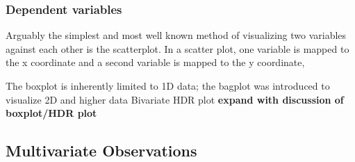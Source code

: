 \documentclass[../main.tex]{subfiles}
\begin{document}
\subsubsection{Dependent variables}
Arguably the simplest and most well known method of visualizing two
variables against each other is the scatterplot\cite{friendly2005}. In
a scatter plot, one variable is mapped to the x coordinate and a
second variable is mapped to the y coordinate,  

\begin{figure}
  \end{figure}
  The boxplot is inherently limited to 1D data; the bagplot was
  introduced to
  visualize 2D and higher data \cite{rousseeuw1999}
  Bivariate HDR plot \cite{hyndman1996} \textbf{expand with discussion
  of
    boxplot/HDR plot}
    


\subsection{Multivariate Observations}



\end{document}

